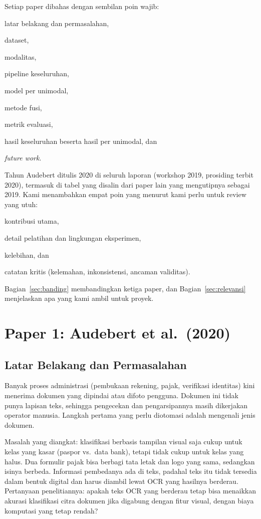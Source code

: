 Setiap paper dibahas dengan sembilan poin wajib:
\begin{enumerate*}[label=(\arabic*)]
  \item latar belakang dan permasalahan,
  \item dataset,
  \item modalitas,
  \item pipeline keseluruhan,
  \item model per unimodal,
  \item metode fusi,
  \item metrik evaluasi,
  \item hasil keseluruhan beserta hasil per unimodal, dan
  \item \emph{future work}.
\end{enumerate*}
Tahun Audebert ditulis 2020 di seluruh laporan (workshop 2019, prosiding terbit 2020),
termasuk di tabel yang disalin dari paper lain yang mengutipnya sebagai 2019.
Kami menambahkan empat poin yang menurut kami perlu untuk review yang utuh:
\begin{enumerate*}[label=(\arabic*), start=10]
  \item kontribusi utama,
  \item detail pelatihan dan lingkungan eksperimen,
  \item kelebihan, dan
  \item catatan kritis (kelemahan, inkonsistensi, ancaman validitas).
\end{enumerate*}
Bagian~\ref{sec:banding} membandingkan ketiga paper, dan Bagian~\ref{sec:relevansi}
menjelaskan apa yang kami ambil untuk proyek.

\section{Paper 1: Audebert et al.\ (2020)}\label{sec:audebert}

\subsection{Latar Belakang dan Permasalahan}
Banyak proses administrasi (pembukaan rekening, pajak, verifikasi identitas) kini
menerima dokumen yang dipindai atau difoto pengguna. Dokumen ini tidak punya lapisan
teks, sehingga pengecekan dan pengarsipannya masih dikerjakan operator manusia.
Langkah pertama yang perlu diotomasi adalah mengenali jenis dokumen.

Masalah yang diangkat: klasifikasi berbasis tampilan visual saja cukup untuk kelas
yang kasar (paspor vs.\ data bank), tetapi tidak cukup untuk kelas yang halus. Dua
formulir pajak bisa berbagi tata letak dan logo yang sama, sedangkan isinya berbeda.
Informasi pembedanya ada di teks, padahal teks itu tidak tersedia dalam bentuk digital
dan harus diambil lewat OCR yang hasilnya berderau. Pertanyaan penelitiannya: apakah
teks OCR yang berderau tetap bisa menaikkan akurasi klasifikasi citra dokumen jika
digabung dengan fitur visual, dengan biaya komputasi yang tetap rendah?

